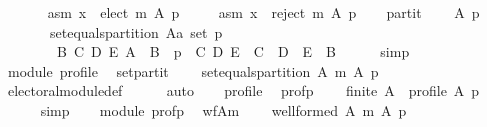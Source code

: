 \begin{isabellebody}
\ \ \isamarkupfalse%
\isanewline
\ \ \ \ asm{}{\isacharcolon}{\kern0pt}\ {\isachardoublequoteopen}x\ {\isasymin}\ elect\ m\ A\ p{\isachardoublequoteclose}\ \isanewline
\ \ \ \ asm{}{\isacharcolon}{\kern0pt}\ {\isachardoublequoteopen}x\ {\isasymin}\ reject\ m\ A\ p{\isachardoublequoteclose}\isanewline
\ \ \isamarkupfalse%
\ partit{\isacharcolon}{\kern0pt}\isanewline
\ \ \ \ {\isachardoublequoteopen}{\isasymforall}A\ p{\isachardot}{\kern0pt}\isanewline
\ \ \ \ \ \ {\isasymnot}\ set{\isacharunderscore}{\kern0pt}equals{\isacharunderscore}{\kern0pt}partition\ {\isacharparenleft}{\kern0pt}A{\isacharcolon}{\kern0pt}{\isacharcolon}{\kern0pt}{\isacharprime}{\kern0pt}a\ set{\isacharparenright}{\kern0pt}\ p\ {\isasymor}\isanewline
\ \ \ \ \ \ \ \ {\isacharparenleft}{\kern0pt}{\isasymexists}B\ C\ D\ E{\isachardot}{\kern0pt}\ A\ {\isacharequal}{\kern0pt}\ B\ {\isasymand}\ p\ {\isacharequal}{\kern0pt}\ {\isacharparenleft}{\kern0pt}C{\isacharcomma}{\kern0pt}\ D{\isacharcomma}{\kern0pt}\ E{\isacharparenright}{\kern0pt}\ {\isasymand}\ C\ {\isasymunion}\ D\ {\isasymunion}\ E\ {\isacharequal}{\kern0pt}\ B{\isacharparenright}{\kern0pt}{\isachardoublequoteclose}\isanewline
\ \ \ \ \isamarkupfalse%
\ simp\isanewline
\ \ \isamarkupfalse%
\ module\ profile\ \isamarkupfalse%
\ set{\isacharunderscore}{\kern0pt}partit{\isacharcolon}{\kern0pt}\isanewline
\ \ \ \ {\isachardoublequoteopen}set{\isacharunderscore}{\kern0pt}equals{\isacharunderscore}{\kern0pt}partition\ A\ {\isacharparenleft}{\kern0pt}m\ A\ p{\isacharparenright}{\kern0pt}{\isachardoublequoteclose}\isanewline
\ \ \ \ \isamarkupfalse%
\ electoral{\isacharunderscore}{\kern0pt}module{\isacharunderscore}{\kern0pt}def\isanewline
\ \ \ \ \isamarkupfalse%
\ auto\isanewline
\ \ \isamarkupfalse%
\ profile\ \isamarkupfalse%
\ prof{\isacharunderscore}{\kern0pt}p{\isacharcolon}{\kern0pt}\isanewline
\ \ \ \ {\isachardoublequoteopen}finite\ A\ {\isasymand}\ profile\ A\ p{\isachardoublequoteclose}\isanewline
\ \ \ \ \isamarkupfalse%
\ simp\isanewline
\ \ \isamarkupfalse%
\ module\ prof{\isacharunderscore}{\kern0pt}p\ \isamarkupfalse%
\ wf{\isacharunderscore}{\kern0pt}A{\isacharunderscore}{\kern0pt}m{\isacharcolon}{\kern0pt}\isanewline
\ \ \ \ {\isachardoublequoteopen}well{\isacharunderscore}{\kern0pt}formed\ A\ {\isacharparenleft}{\kern0pt}m\ A\ p{\isacharparenright}{\kern0pt}{\isachardoublequoteclose}\isanewline

\end{isabellebody}
